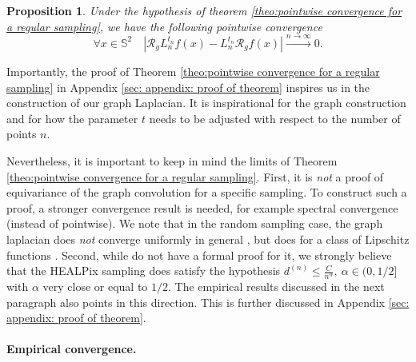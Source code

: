 \documentclass{article} %
\newtheorem{prop}{Proposition}
\newcommand{\todo}[1]{{\color[rgb]{.6,.1,.6}{#1}}}
\newcommand{\linefrac}[2]{
    {#1/#2}
}
\begin{document}
\begin{prop}\label{prop:equivariance}
Under the hypothesis of theorem \ref{theo:pointwise convergence for a regular sampling}, we have the following pointwise convergence
\begin{equation*}
\forall x\in\mathbb S^2\quad\left| \mathcal R_g L_n^{t_n} f (x) - L_n^{t_n} \mathcal R_g f(x) \right| \xrightarrow{n\to\infty}0.
\end{equation*}
\end{prop}

Importantly, the proof of Theorem \ref{theo:pointwise convergence for a regular sampling} in Appendix \ref{sec: appendix: proof of theorem} inspires us in the construction of our graph Laplacian. It is inspirational for the graph construction and for how the parameter $t$ needs to be adjusted with respect to the number of points $n$.

Nevertheless, it is important to keep in mind the limits of Theorem \ref{theo:pointwise convergence for a regular sampling}.
First, it is \emph{not} a proof of equivariance of the graph convolution for a specific sampling. To construct such a proof, a stronger convergence result is needed, for example spectral convergence (instead of pointwise).
We note that in the random sampling case, the graph laplacian does \emph{not} converge uniformly in general \cite[Sec. 3]{belkin2007convergence}, but does for a class of Lipschitz functions \cite[Sec. 6]{belkin2005towards}.  Second, while do not have a formal proof for it, we strongly believe that the HEALPix sampling does satisfy the hypothesis $d^{(n)}\leq \frac{C}{n^\alpha}, \ \alpha\in (0,\linefrac{1}{2}]$ with $\alpha$ very close or equal to $\linefrac{1}{2}$. The empirical results discussed in the next paragraph also points in this direction. This is further discussed in Appendix \ref{sec: appendix: proof of theorem}.

\paragraph{Empirical convergence.}
\end{document}
